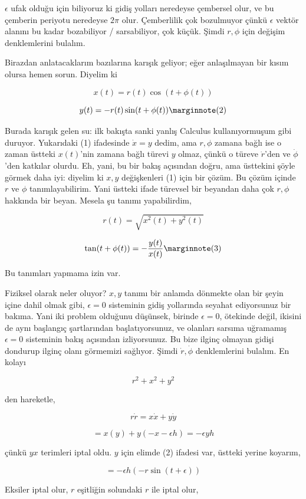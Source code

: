 \documentclass[12pt,fleqn]{article}\usepackage{../../common}
\begin{document}
$\epsilon$ ufak olduğu için biliyoruz ki gidiş yolları neredeyse çembersel olur,
ve bu çemberin periyotu neredeyse $2\pi$ olur. Çemberlilik çok bozulmuyor çünkü
$\epsilon$ vektör alanını bu kadar bozabiliyor / sarsabiliyor, çok küçük. Şimdi
$r,\phi$ için değişim denklemlerini bulalım.

Birazdan anlatacaklarım bazılarına karışık geliyor; eğer anlaşılmayan bir kısım
olursa hemen sorun. Diyelim ki

$$ x(t) = r(t) \cos (t+\phi(t)) $$

$$ 
y(t) = -r(t) \sin (t+\phi(t)) 
\mlabel{2} 
$$

Burada karışık gelen su: ilk bakışta sanki yanlış Calculus kullanıyormuşum gibi
duruyor. Yukarıdaki (1) ifadesinde $\dot{x}=y$ dedim, ama $r,\phi$ zamana bağlı
ise o zaman üstteki $x(t)$'nin zamana bağlı türevi $y$ olmaz, çünkü o türeve
$\dot{r}$'den ve $\dot{\phi}$'den katkılar olurdu. Eh, yani, bu bir bakış
açısından doğru, ama üsttekini şöyle görmek daha iyi: diyelim ki $x,y$
değişkenleri (1) için bir çözüm. Bu çözüm içinde $r$ ve $\phi$
tanımlayabilirim. Yani üstteki ifade türevsel bir beyandan daha çok $r,\phi$
hakkında bir beyan. Mesela şu tanımı yapabilirdim,

$$ r(t) = \sqrt{x^2(t) + y^2(t)} $$

$$ 
\tan(t + \phi(t)) = -\frac{y(t)}{x(t)} 
\mlabel{3} 
$$

Bu tanımları yapmama izin var.

Fiziksel olarak neler oluyor? $x,y$ tanımı bir anlamda dönmekte olan bir şeyin
içine dahil olmak gibi, $\epsilon = 0$ sisteminin gidiş yollarında seyahat
ediyorsunuz bir bakıma. Yani iki problem olduğunu düşünsek, birinde
$\epsilon=0$, ötekinde değil, ikisini de aynı başlangıç şartlarından
başlatıyorsunuz, ve olanları sarsıma uğramamış $\epsilon = 0$ sisteminin bakış
açısından izliyorsunuz. Bu bize ilginç olmayan gidişi dondurup ilginç olanı
görmemizi sağlıyor. Şimdi $\dot{r},\dot{\phi}$ denklemlerini bulalım. En kolayı

$$ r^2 + x^2 + y^2 $$

den hareketle,

$$ r\dot{r} = x\dot{x} + y\dot{y} $$

$$ = x(y) + y(-x -\epsilon h) = -\epsilon yh$$

çünkü $yx$ terimleri iptal oldu. $y$ için elimde (2) ifadesi var, üstteki yerine
koyarım,

$$ = -\epsilon h(-r \sin(t + \epsilon)) $$

Eksiler iptal olur, $r$ eşitliğin solundaki $r$ ile iptal olur,
\end{document}
